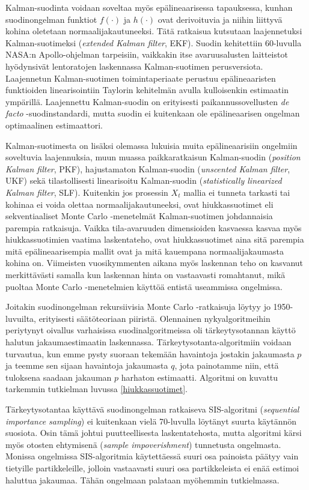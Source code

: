 \documentclass[
  12pt,
  a4paper, twoside]{book}
\begin{document}
Kalman-suodinta voidaan soveltaa myös epälineaarisessa tapauksessa, kunhan suodinongelman funktiot \(f(\cdot)\) ja \(h(\cdot)\) ovat derivoituvia ja niihin liittyvä kohina oletetaan normaalijakautuneeksi. Tätä ratkaisua kutsutaan laajennetuksi Kalman-suotimeksi (\emph{extended Kalman filter}, EKF). Suodin kehitettiin 60-luvulla NASA:n Apollo-ohjelman tarpeisiin, vaikkakin itse avaruusalusten laitteistot hyödynsivät lentoratojen laskennassa Kalman-suotimen perusversiota. Laajennetun Kalman-suotimen toimintaperiaate perustuu epälineaaristen funktioiden linearisointiin Taylorin kehitelmän avulla kulloisenkin estimaatin ympärillä. Laajennettu Kalman-suodin on erityisesti paikannussovellusten \textit{de facto} -suodinstandardi, mutta suodin ei kuitenkaan ole epälineaarisen ongelman optimaalinen estimaattori.

Kalman-suotimesta on lisäksi olemassa lukuisia muita epälineaarisiin ongelmiin soveltuvia laajennuksia, muun muassa paikkaratkaisun Kalman-suodin (\emph{position Kalman filter}, PKF), hajustamaton Kalman-suodin (\emph{unscented Kalman filter}, UKF) sekä tilastollisesti linearisoitu Kalman-suodin (\emph{statistically linearized Kalman filter}, SLF). Kuitenkin jos prosessin \(X_t\) mallia ei tunneta tarkasti tai kohinaa ei voida olettaa normaalijakautuneeksi, ovat hiukkassuotimet eli sekventiaaliset Monte Carlo -menetelmät Kalman-suotimen johdannaisia parempia ratkaisuja. Vaikka tila-avaruuden dimensioiden kasvaessa kasvaa myös hiukkassuotimien vaatima laskentateho, ovat hiukkassuotimet aina sitä parempia mitä epälineaarisempia mallit ovat ja mitä kauempana normaalijakaumasta kohina on. Viimeisten vuosikymmenten aikana myös laskennan teho on kasvanut merkittävästi samalla kun laskennan hinta on vastaavasti romahtanut, mikä puoltaa Monte Carlo -menetelmien käyttöä entistä useammissa ongelmissa.

Joitakin suodinongelman rekursiivisia Monte Carlo -ratkaisuja löytyy jo 1950-luvuilta, erityisesti säätöteoriaan piiristä. Olennainen nykyalgoritmeihin periytynyt oivallus varhaisissa suodinalgoritmeissa oli tärkeytysotannan käyttö halutun jakaumaestimaatin laskennassa. Tärkeytysotanta-algoritmiin voidaan turvautua, kun emme pysty suoraan tekemään havaintoja jostakin jakaumasta \(p\) ja teemme sen sijaan havaintoja jakaumasta \(q\), jota painotamme niin, että tuloksena saadaan jakauman \(p\) harhaton estimaatti. Algoritmi on kuvattu tarkemmin tutkielman luvussa \ref{hiukkassuotimet}.

Tärkeytysotantaa käyttävä suodinongelman ratkaiseva SIS-algoritmi (\emph{sequential importance sampling}) ei kuitenkaan vielä 70-luvulla löytänyt suurta käytännön suosiota. Osin tämä johtui puutteellisesta laskentatehosta, mutta algoritmi kärsi myös otosten ehtymisenä (\emph{sample impoverishment}) tunnetusta ongelmasta. Monissa ongelmissa SIS-algoritmia käytettäessä suuri osa painoista päätyy vain tietyille partikkeleille, jolloin vastaavasti suuri osa partikkeleista ei enää estimoi haluttua jakaumaa. Tähän ongelmaan palataan myöhemmin tutkielmassa.
\end{document}
